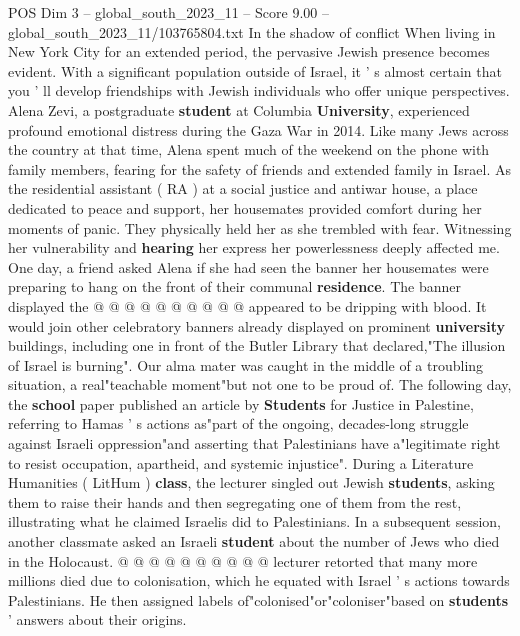 \begin{textsample}{POS Dim 3 – global\_south\_2023\_11 – Score 9.00 – global\_south\_2023\_11/103765804.txt}  \label{ex:f3_pos_355}
In the shadow of conflict When living in New York City for an extended period, the pervasive Jewish presence becomes evident.
With a significant population outside of Israel, it ' s almost certain that you ' ll develop friendships with Jewish individuals who offer unique perspectives.
Alena Zevi, a postgraduate \textbf{student} at Columbia \textbf{University}, experienced profound emotional distress during the Gaza War in 2014.
Like many Jews across the country at that time, Alena spent much of the weekend on the phone with family members, fearing for the safety of friends and extended family in Israel.
As the residential assistant ( RA ) at a social justice and antiwar house, a place dedicated to peace and support, her housemates provided comfort during her moments of panic.
They physically held her as she trembled with fear.
Witnessing her vulnerability and \textbf{hearing} her express her powerlessness deeply affected me.
One day, a friend asked Alena if she had seen the banner her housemates were preparing to hang on the front of their communal \textbf{residence}.
The banner displayed the @ @ @ @ @ @ @ @ @ @ appeared to be dripping with blood.
It would join other celebratory banners already displayed on prominent \textbf{university} buildings, including one in front of the Butler Library that declared,"The illusion of Israel is burning".
Our alma mater was caught in the middle of a troubling situation, a real"teachable moment"but not one to be proud of.
The following day, the \textbf{school} paper published an article by \textbf{Students} for Justice in Palestine, referring to Hamas ' s actions as"part of the ongoing, decades-long struggle against Israeli oppression"and asserting that Palestinians have a"legitimate right to resist occupation, apartheid, and systemic injustice".
During a Literature Humanities ( LitHum ) \textbf{class}, the lecturer singled out Jewish \textbf{students}, asking them to raise their hands and then segregating one of them from the rest, illustrating what he claimed Israelis did to Palestinians.
In a subsequent session, another classmate asked an Israeli \textbf{student} about the number of Jews who died in the Holocaust. @ @ @ @ @ @ @ @ @ @ lecturer retorted that many more millions died due to colonisation, which he equated with Israel ' s actions towards Palestinians.
He then assigned labels of"colonised"or"coloniser"based on \textbf{students} ' answers about their origins.

\end{textsample}
